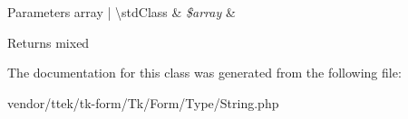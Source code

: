 \begin{DoxyParams}[1]{Parameters}
array | \textbackslash{}std\+Class & {\em \$array} & \\
\hline
\end{DoxyParams}
\begin{DoxyReturn}{Returns}
mixed 
\end{DoxyReturn}


The documentation for this class was generated from the following file\+:\begin{DoxyCompactItemize}
\item 
vendor/ttek/tk-\/form/\+Tk/\+Form/\+Type/String.\+php\end{DoxyCompactItemize}
